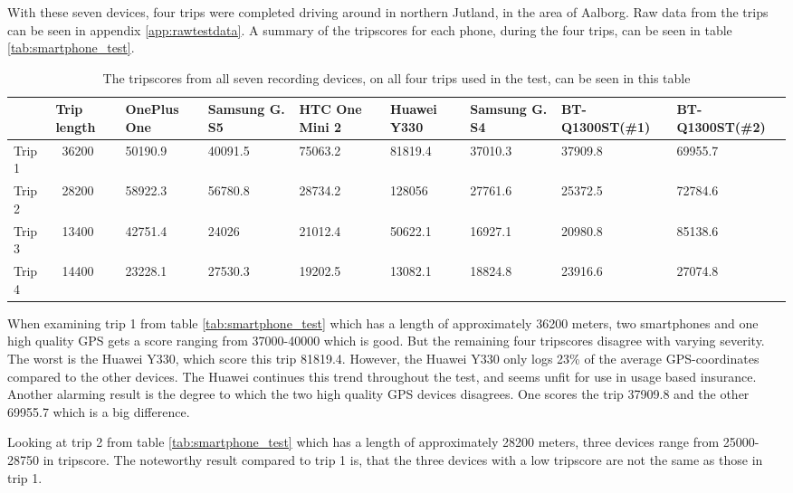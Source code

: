 With these seven devices, four trips were completed driving around in northern Jutland, in the area of Aalborg. Raw data from the trips can be seen in appendix \ref{app:rawtestdata}. A summary of the tripscores for each phone, during the four trips, can be seen in table \ref{tab:smartphone_test}.

\begin{table}[tb]
\centering
\caption{The tripscores from all seven recording devices, on all four trips used in the test, can be seen in this table}
\label{tab:smartphone_test_one}
\begin{tabular}{|l|llllllll}
\hline
\rowcolor{tablegreen}
       & Trip length & OnePlus One & Samsung G. S5 & HTC One Mini 2 & Huawei Y330 & Samsung G. S4 & BT-Q1300ST(\#1) & BT-Q1300ST(\#2) \\\hline
Trip 1 & ~36200      & 50190.9     & 40091.5       & 75063.2        & 81819.4     & 37010.3       & 37909.8         & 69955.7         \\
Trip 2 & ~28200      & 58922.3     & 56780.8       & 28734.2        & 128056      & 27761.6       & 25372.5         & 72784.6         \\
Trip 3 & ~13400      & 42751.4     & 24026         & 21012.4        & 50622.1     & 16927.1       & 20980.8         & 85138.6         \\
Trip 4 & ~14400      & 23228.1     & 27530.3       & 19202.5        & 13082.1     & 18824.8       & 23916.6         & 27074.8 \\\hline
\end{tabular}
\end{table}

When examining trip 1 from table \ref{tab:smartphone_test} which has a length of approximately 36200 meters, two smartphones and one high quality GPS gets a score ranging from 37000-40000 which is good. But the remaining four tripscores disagree with varying severity. The worst is the Huawei Y330, which score this trip 81819.4. However, the Huawei Y330 only logs 23\% of the average GPS-coordinates compared to the other devices. The Huawei continues this trend throughout the test, and seems unfit for use in usage based insurance. Another alarming result is the degree to which the two high quality GPS devices disagrees. One scores the trip 37909.8 and the other 69955.7 which is a big difference.

Looking at trip 2 from table \ref{tab:smartphone_test} which has a length of approximately 28200 meters, three devices range from 25000-28750 in tripscore. The noteworthy result compared to trip 1 is, that the three devices with a low tripscore are not the same as those in trip 1.

